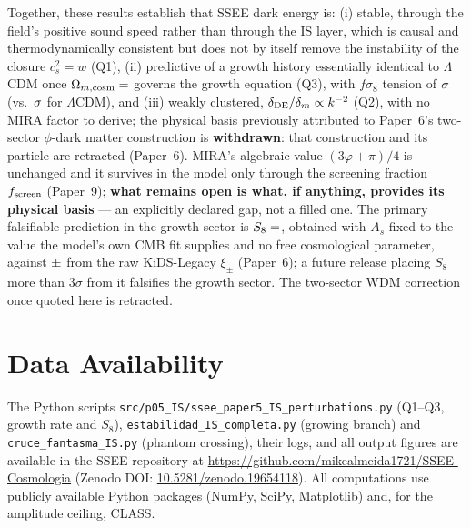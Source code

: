 \documentclass[12pt,a4paper]{article}
\begin{document}
Together, these results establish that SSEE dark energy is:
(i) stable, through the field's positive sound speed rather than through the IS
    layer, which is causal and thermodynamically consistent but does not by itself
    remove the instability of the closure $c^2_s=w$ (Q1),
(ii) predictive of a growth history essentially identical to $\Lambda$CDM
    once $\Omega_{m,\mathrm{cosm}}=\val{OMEGA_M_TOTAL_d6}$ governs the growth equation (Q3),
    with $f\sigma_8$ tension of $\val{fs8_tmedia_ssee}\sigma$ (vs.\ $\val{fs8_tmedia_lcdm}\sigma$ for $\Lambda$CDM), and
(iii) weakly clustered, $\delta_{\rm DE}/\delta_m\propto k^{-2}$ (Q2), with no MIRA factor to derive; the physical basis previously attributed to Paper~6's two-sector $\phi$-dark matter construction is \textbf{withdrawn}: that construction and its particle are retracted (Paper~6). MIRA's algebraic value $(3\varphi+\pi)/4$ is unchanged and it survives in the model only through the screening fraction $f_{\rm screen}$ (Paper~9); \textbf{what remains open is what, if anything, provides its physical basis} --- an explicitly declared gap, not a filled one.
The primary falsifiable prediction in the growth sector is
$S_8 = \val{S8_leg_pred}$, obtained with $A_s$ fixed to the value the model's own CMB fit
supplies and no free cosmological parameter, against $\val{S8_legacy_dato}\pm\val{S8_legacy_dato_sigma}$ from the
raw KiDS-Legacy $\xi_\pm$ (Paper~6); a future release placing $S_8$ more than
$3\sigma$ from it falsifies the growth sector. The two-sector WDM correction once quoted here is
retracted.

\section*{Data Availability}

The Python scripts \texttt{src/p05\_IS/ssee\_paper5\_IS\_perturbations.py} (Q1--Q3,
growth rate and $S_8$), \texttt{estabilidad\_IS\_completa.py} (growing branch) and
\texttt{cruce\_fantasma\_IS.py} (phantom crossing), their logs, and all output figures are available in
the SSEE repository at
\url{https://github.com/mikealmeida1721/SSEE-Cosmologia}
(Zenodo DOI: \href{https://doi.org/10.5281/zenodo.19654118}{10.5281/zenodo.19654118}).
All computations use publicly available Python packages (NumPy, SciPy, Matplotlib)
and, for the amplitude ceiling, CLASS.

\end{document}
